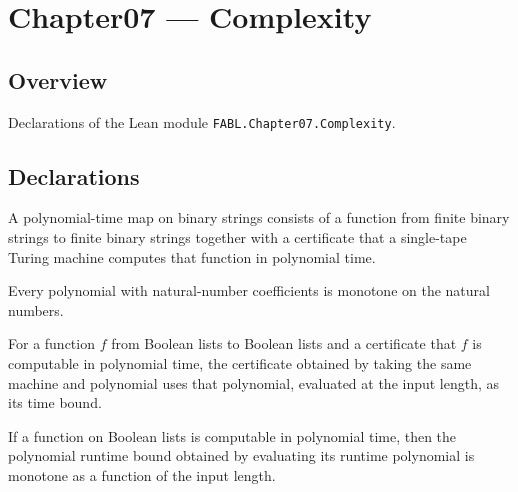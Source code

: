 \chapter{Chapter07 — Complexity}
\section{Overview}

Declarations of the Lean module \texttt{FABL.Chapter07.Complexity}.

\section{Declarations}

\begin{definition}
\label{FABL.PolytimeMap}
\leanok
A polynomial-time map on binary strings consists of a function from finite binary
strings to finite binary strings together with a certificate that a single-tape Turing
machine computes that function in polynomial time.
\end{definition}

\begin{theorem}
\label{FABL.PolytimeMap.polynomial_eval_monotone}
\leanok
{}
Every polynomial with natural-number coefficients is monotone on the natural numbers.
\end{theorem}

\begin{definition}
\label{FABL.PolytimeMap.monotoneBounded}
\leanok
For a function $f$ from Boolean lists to Boolean lists and a certificate that $f$ is
computable in polynomial time, the certificate obtained by taking the same machine and
polynomial uses that polynomial, evaluated at the input length, as its time bound.
\end{definition}

\begin{theorem}
\label{FABL.PolytimeMap.monotone_monotoneBounded}
\leanok
{}
If a function on Boolean lists is computable in polynomial time, then the polynomial
runtime bound obtained by evaluating its runtime polynomial is monotone as a function of
the input length.
\end{theorem}

